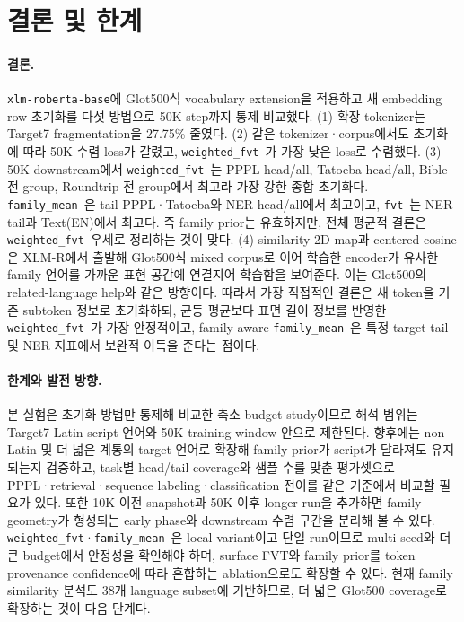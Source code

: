 \documentclass[11pt,a4paper]{article}
\newcommand{\fvt}{\texttt{fvt}}
\newcommand{\wfvt}{\texttt{weighted\_fvt}}
\newcommand{\famm}{\texttt{family\_mean}}
\begin{document}
\section{결론 및 한계}

\paragraph{결론.} \texttt{xlm-roberta-base}에 Glot500식 vocabulary extension을 적용하고 새 embedding row 초기화를 다섯 방법으로 50K-step까지 통제 비교했다. (1) 확장 tokenizer는 Target7 fragmentation을 27.75\% 줄였다. (2) 같은 tokenizer·corpus에서도 초기화에 따라 50K 수렴 loss가 갈렸고, \wfvt\ 가 가장 낮은 loss로 수렴했다. (3) 50K downstream에서 \wfvt\ 는 PPPL head/all, Tatoeba head/all, Bible 전 group, Roundtrip 전 group에서 최고라 가장 강한 종합 초기화다. \famm\ 은 tail PPPL·Tatoeba와 NER head/all에서 최고이고, \fvt\ 는 NER tail과 Text(EN)에서 최고다. 즉 family prior는 유효하지만, 전체 평균적 결론은 \wfvt\ 우세로 정리하는 것이 맞다. (4) similarity 2D map과 centered cosine은 XLM-R에서 출발해 Glot500식 mixed corpus로 이어 학습한 encoder가 유사한 family 언어를 가까운 표현 공간에 연결지어 학습함을 보여준다. 이는 Glot500의 related-language help와 같은 방향이다. 따라서 가장 직접적인 결론은 새 token을 기존 subtoken 정보로 초기화하되, 균등 평균보다 표면 길이 정보를 반영한 \wfvt\ 가 가장 안정적이고, family-aware \famm\ 은 특정 target tail 및 NER 지표에서 보완적 이득을 준다는 점이다.

\paragraph{한계와 발전 방향.} 본 실험은 초기화 방법만 통제해 비교한 축소 budget study이므로 해석 범위는 Target7 Latin-script 언어와 50K training window 안으로 제한된다. 향후에는 non-Latin 및 더 넓은 계통의 target 언어로 확장해 family prior가 script가 달라져도 유지되는지 검증하고, task별 head/tail coverage와 샘플 수를 맞춘 평가셋으로 PPPL·retrieval·sequence labeling·classification 전이를 같은 기준에서 비교할 필요가 있다. 또한 10K 이전 snapshot과 50K 이후 longer run을 추가하면 family geometry가 형성되는 early phase와 downstream 수렴 구간을 분리해 볼 수 있다. \wfvt·\famm\ 은 local variant이고 단일 run이므로 multi-seed와 더 큰 budget에서 안정성을 확인해야 하며, surface FVT와 family prior를 token provenance confidence에 따라 혼합하는 ablation으로도 확장할 수 있다. 현재 family similarity 분석도 38개 language subset에 기반하므로, 더 넓은 Glot500 coverage로 확장하는 것이 다음 단계다.
\end{document}
